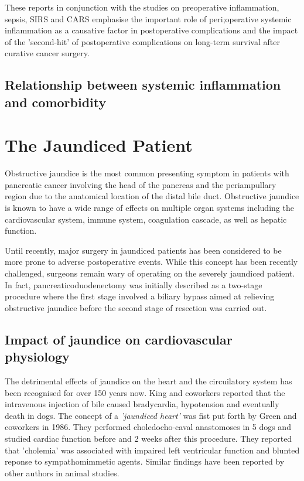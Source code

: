 These reports in conjunction with the studies on preoperative inflammation, sepsis, SIRS and CARS emphasise the important role of peri;operative systemic inflammation as a causative factor in postoperative complications and the impact of the 'second-hit' of postoperative complications on long-term survival after curative cancer surgery.

\subsection{Relationship between systemic inflammation and comorbidity}


\section{The Jaundiced Patient}

Obstructive jaundice is the most common presenting symptom in patients with pancreatic cancer involving the head of the pancreas and the periampullary region due to the anatomical location of the distal bile duct. Obstructive jaundice is known to have a wide range of effects on multiple organ systems including the cardiovascular system, immune system, coagulation cascade, as well as hepatic function.

Until recently, major surgery in jaundiced patients has been considered to be more prone to adverse postoperative events. While this concept has been recently challenged, surgeons remain wary of operating on the severely jaundiced patient. In fact, pancreaticoduodenectomy was initially described as a two-stage procedure where the first stage involved a biliary bypass aimed at relieving obstructive jaundice before the second stage of resection was carried out.


\subsection{Impact of jaundice on cardiovascular physiology}

The detrimental effects of jaundice on the heart and the circuilatory system has been recognised for over 150 years now. King and coworkers reported that the intravenous injection of bile caused bradycardia, hypotension and eventually death in dogs.\parencite{king_effect_1909} The concept of a \textit{'jaundiced heart'} was fist put forth by Green and coworkers in 1986.\parencite{green_jaundiced_1986} They performed choledocho-caval anastomoses in 5 dogs and studied cardiac function before and 2 weeks after this procedure. They reported that 'cholemia' was associated with impaired left ventricular function and blunted reponse to sympathomimmetic agents. Similar findings have been reported by other authors in animal studies. \parencite{binah_obstructive_1985,bomzon_systemic_1986}

